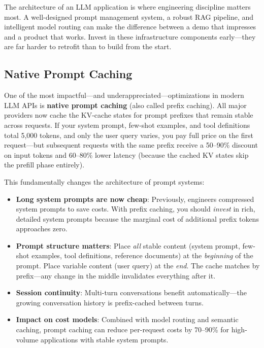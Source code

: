 \begin{keytakeaway}
The architecture of an LLM application is where engineering discipline matters most. A well-designed prompt management system, a robust RAG pipeline, and intelligent model routing can make the difference between a demo that impresses and a product that works. Invest in these infrastructure components early---they are far harder to retrofit than to build from the start.
\end{keytakeaway}


\subsection{Native Prompt Caching}

One of the most impactful---and underappreciated---optimizations in modern LLM APIs is \textbf{native prompt caching} (also called prefix caching). All major providers now cache the KV-cache states for prompt prefixes that remain stable across requests. If your system prompt, few-shot examples, and tool definitions total 5,000 tokens, and only the user query varies, you pay full price on the first request---but subsequent requests with the same prefix receive a 50--90\% discount on input tokens and 60--80\% lower latency (because the cached KV states skip the prefill phase entirely).

This fundamentally changes the architecture of prompt systems:

\begin{itemize}[leftmargin=*]
    \item \textbf{Long system prompts are now cheap}: Previously, engineers compressed system prompts to save costs. With prefix caching, you should \emph{invest} in rich, detailed system prompts because the marginal cost of additional prefix tokens approaches zero.
    \item \textbf{Prompt structure matters}: Place \emph{all} stable content (system prompt, few-shot examples, tool definitions, reference documents) at the \emph{beginning} of the prompt. Place variable content (user query) at the \emph{end}. The cache matches by prefix---any change in the middle invalidates everything after it.
    \item \textbf{Session continuity}: Multi-turn conversations benefit automatically---the growing conversation history is prefix-cached between turns.
    \item \textbf{Impact on cost models}: Combined with model routing and semantic caching, prompt caching can reduce per-request costs by 70--90\% for high-volume applications with stable system prompts.
\end{itemize}

